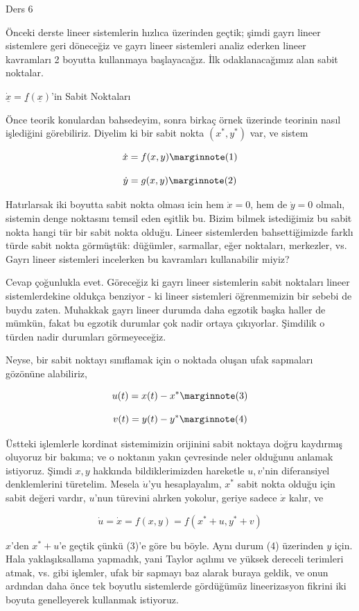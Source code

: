 \documentclass[12pt,fleqn]{article}\usepackage{../../common}
\begin{document}
Ders 6

Önceki derste lineer sistemlerin hızlıca üzerinden geçtik; şimdi gayrı lineer
sistemlere geri döneceğiz ve gayrı lineer sistemleri analiz ederken lineer
kavramları 2 boyutta kullanmaya başlayacağız. İlk odaklanacağımız alan sabit
noktalar.

$\dot{\underline{x}} = \underline{f}(\underline{x})$'in Sabit Noktaları

Önce teorik konulardan bahsedeyim, sonra birkaç örnek üzerinde teorinin nasıl
işlediğini görebiliriz. Diyelim ki bir sabit nokta $(x^*,y^*)$ var, ve sistem

$$
\dot{x} = f(x,y) 
\mlabel{1}
$$

$$
\dot{y} = g(x,y) 
\mlabel{2}
$$

Hatırlarsak iki boyutta sabit nokta olması icin hem $\dot{x}=0$, hem de
$\dot{y}=0$ olmalı, sistemin denge noktasını temsil eden eşitlik bu. Bizim
bilmek istediğimiz bu sabit nokta hangi tür bir sabit nokta olduğu. Lineer
sistemlerden bahsettiğimizde farklı türde sabit nokta görmüştük: düğümler,
sarmallar, eğer noktaları, merkezler, vs. Gayrı lineer sistemleri incelerken bu
kavramları kullanabilir miyiz?

Cevap çoğunlukla evet. Göreceğiz ki gayrı lineer sistemlerin sabit noktaları
lineer sistemlerdekine oldukça benziyor - ki lineer sistemleri öğrenmemizin bir
sebebi de buydu zaten. Muhakkak gayrı lineer durumda daha egzotik başka haller
de mümkün, fakat bu egzotik durumlar çok nadir ortaya çıkıyorlar. Şimdilik o türden
nadir durumları görmeyeceğiz.

Neyse, bir sabit noktayı sınıflamak için o noktada oluşan ufak sapmaları
gözönüne alabiliriz,

$$ 
u(t) = x(t) - x^* 
\mlabel{3}
$$

$$ 
v(t) = y(t) - y^* 
\mlabel{4}
$$

Üstteki işlemlerle kordinat sistemimizin orijinini sabit noktaya doğru kaydırmış
oluyoruz bir bakıma; ve o noktanın yakın çevresinde neler olduğunu anlamak
istiyoruz. Şimdi $x,y$ hakkında bildiklerimizden hareketle $u,v$'nin
diferansiyel denklemlerini türetelim. Mesela $\dot{u}$'yu hesaplayalım, $x^*$
sabit nokta olduğu için sabit değeri vardır, $u$'nun türevini alırken yokolur,
geriye sadece $\dot{x}$ kalır, ve

$$ \dot{u} = \dot{x} = f(x,y) = f(x^*+u, y^*+v)$$

$x$'den $x^*+u$'e geçtik çünkü (3)'e göre bu böyle. Aynı durum (4) üzerinden $y$
için. Hala yaklaşıksallama yapmadık, yani Taylor açılımı ve yüksek dereceli
terimleri atmak, vs. gibi işlemler, ufak bir sapmayı baz alarak buraya geldik,
ve onun ardından daha önce tek boyutlu sistemlerde gördüğümüz lineerizasyon
fikrini iki boyuta genelleyerek kullanmak istiyoruz.
\end{document}
